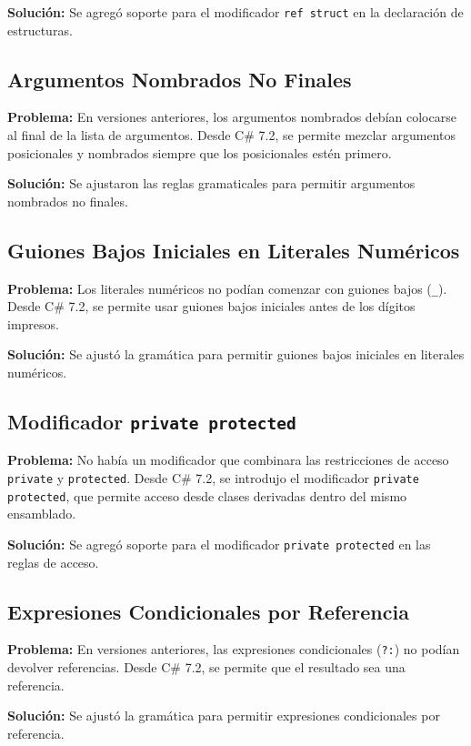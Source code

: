 \textbf{Solución:} Se agregó soporte para el modificador \texttt{ref struct} en la declaración de estructuras.

\subsection*{Argumentos Nombrados No Finales}
\textbf{Problema:} En versiones anteriores, los argumentos nombrados debían colocarse al final de la lista de argumentos. Desde C\# 7.2, se permite mezclar argumentos posicionales y nombrados siempre que los posicionales estén primero.

\textbf{Solución:} Se ajustaron las reglas gramaticales para permitir argumentos nombrados no finales.

\subsection*{Guiones Bajos Iniciales en Literales Numéricos}
\textbf{Problema:} Los literales numéricos no podían comenzar con guiones bajos (\texttt{\_}). Desde C\# 7.2, se permite usar guiones bajos iniciales antes de los dígitos impresos.

\textbf{Solución:} Se ajustó la gramática para permitir guiones bajos iniciales en literales numéricos.

\subsection*{Modificador \texttt{private protected}}
\textbf{Problema:} No había un modificador que combinara las restricciones de acceso \texttt{private} y \texttt{protected}. Desde C\# 7.2, se introdujo el modificador \texttt{private protected}, que permite acceso desde clases derivadas dentro del mismo ensamblado.

\textbf{Solución:} Se agregó soporte para el modificador \texttt{private protected} en las reglas de acceso.

\subsection*{Expresiones Condicionales por Referencia}
\textbf{Problema:} En versiones anteriores, las expresiones condicionales (\texttt{?:}) no podían devolver referencias. Desde C\# 7.2, se permite que el resultado sea una referencia.

\textbf{Solución:} Se ajustó la gramática para permitir expresiones condicionales por referencia.


